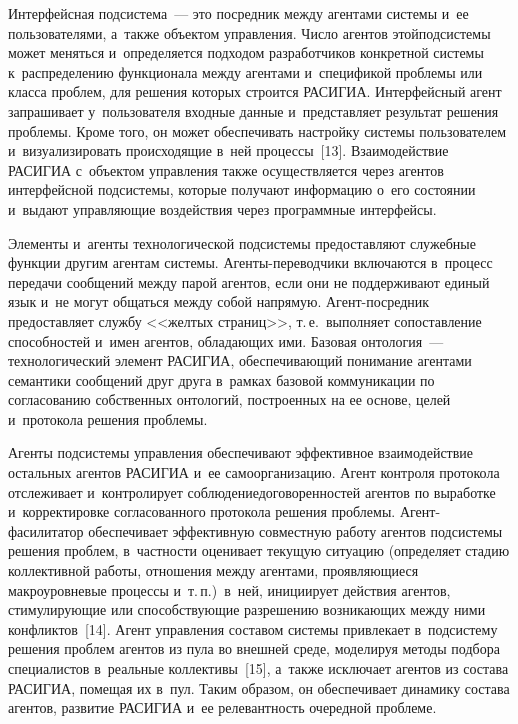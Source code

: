 \begin{multicols}{2}
  Интерфейсная подсистема~--- это посредник меж\-ду агентами системы и~ее 
пользователями, а~так\-же объектом управ\-ле\-ния. Чис\-ло агентов этой\linebreak под\-сис\-те\-мы 
может меняться и~определяется подходом разработчиков конкретной  
сис\-те\-мы к~распределению функционала между агентами и~спецификой 
проблемы или класса проб\-лем, для \mbox{решения} которых строится 
\mbox{РАСИГИА}. Интерфейсный агент запрашивает у~пользователя входные 
данные и~представляет результат решения проб\-ле\-мы. Кроме того, он может 
обеспечивать на\-строй\-ку сис\-те\-мы пользователем и~визуализировать 
происходящие в~ней процессы~[13]. Взаимодействие \mbox{РАСИГИА} 
с~объектом управ\-ле\-ния также осуществляется через агентов интерфейсной 
под\-сис\-те\-мы, которые получают информацию о~его со\-сто\-янии и~выдают 
управ\-ля\-ющие воздействия через программные ин\-тер\-фейсы.
  
  Элементы и~агенты технологической под\-сис\-те\-мы предоставляют служебные 
функции другим агентам сис\-те\-мы. Аген\-ты-пе\-ре\-вод\-чи\-ки включаются в~процесс 
передачи сообщений меж\-ду парой агентов, если они не поддерживают единый 
язык и~не могут общаться между собой напрямую. Агент-по\-сред\-ник 
предостав\-ля\-ет служ\-бу <<желтых страниц>>, т.\,е.\ выполняет сопоставление 
способностей и~имен агентов, об\-ла\-да\-ющих ими. Базовая онтология~--- 
технологический элемент \mbox{РАСИГИА}, обес\-пе\-чи\-ва\-ющий понимание 
агентами семантики сообщений друг друга в~рамках базовой коммуникации по 
согласованию собственных онтологий, по\-стро\-ен\-ных на ее основе, целей 
и~протокола решения проб\-лемы. 
  
  Агенты подсистемы управ\-ле\-ния обеспечивают эффективное взаимодействие 
остальных агентов \mbox{РАСИГИА} и~ее самоорганизацию. Агент контроля 
протокола отслеживает и~контролирует соблюдение\linebreak договоренностей агентов 
по выработке и~корректировке согласованного протокола решения проб\-ле\-мы. 
Агент-фа\-си\-ли\-та\-тор обеспечивает эффективную совместную работу 
агентов под\-сис\-те\-мы \mbox{решения} проб\-лем, в~част\-ности оценивает текущую 
ситуацию (определяет стадию коллективной работы, отношения между 
агентами, про\-яв\-ля\-ющи\-еся мак\-ро\-уров\-не\-вые процессы и~т.\,п.)\ в~ней, 
инициирует действия агентов, сти\-му\-ли\-ру\-ющие или  
спо\-соб\-ст\-ву\-ющие разрешению воз\-ни\-ка\-ющих меж\-ду ними 
конфликтов~[14]. Агент управ\-ле\-ния составом сис\-те\-мы привлекает 
в~под\-сис\-те\-му решения проб\-лем агентов из пула во внеш\-ней среде, моделируя 
методы подбора специалистов в~реальные коллективы~[15], а~также исключает 
агентов из со\-ста\-ва \mbox{РАСИГИА}, помещая их в~пул. Таким образом, он 
обеспечивает динамику со\-ста\-ва агентов, развитие \mbox{РАСИГИА} и~ее 
ре\-ле\-вант\-ность очередной проб\-леме.
  

\end{multicols}
